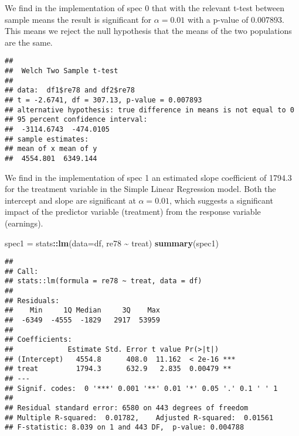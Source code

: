 \documentclass[
]{article}
\newenvironment{Shaded}{\begin{snugshade}}{\end{snugshade}}
\newcommand{\AttributeTok}[1]{\textcolor[rgb]{0.13,0.29,0.53}{#1}}
\newcommand{\FunctionTok}[1]{\textcolor[rgb]{0.13,0.29,0.53}{\textbf{#1}}}
\newcommand{\NormalTok}[1]{#1}
\newcommand{\OtherTok}[1]{\textcolor[rgb]{0.56,0.35,0.01}{#1}}
\newcommand{\SpecialCharTok}[1]{\textcolor[rgb]{0.81,0.36,0.00}{\textbf{#1}}}
\begin{document}
We find in the implementation of spec 0 that with the relevant t-test
between sample means the result is significant for \(\alpha = 0.01\)
with a p-value of 0.007893. This means we reject the null hypothesis
that the means of the two populations are the same.

\begin{Shaded}
\end{Shaded}

\begin{verbatim}
## 
##  Welch Two Sample t-test
## 
## data:  df1$re78 and df2$re78
## t = -2.6741, df = 307.13, p-value = 0.007893
## alternative hypothesis: true difference in means is not equal to 0
## 95 percent confidence interval:
##  -3114.6743  -474.0105
## sample estimates:
## mean of x mean of y 
##  4554.801  6349.144
\end{verbatim}

We find in the implementation of spec 1 an estimated slope coefficient
of 1794.3 for the treatment variable in the Simple Linear Regression
model. Both the intercept and slope are significant at
\(\alpha = 0.01\), which suggests a significant impact of the predictor
variable (treatment) from the response variable (earnings).

\begin{Shaded}
\begin{Highlighting}[]
\NormalTok{spec1 }\OtherTok{=}\NormalTok{ stats}\SpecialCharTok{::}\FunctionTok{lm}\NormalTok{(}\AttributeTok{data=}\NormalTok{df, re78 }\SpecialCharTok{\textasciitilde{}}\NormalTok{ treat)}
\FunctionTok{summary}\NormalTok{(spec1)}
\end{Highlighting}
\end{Shaded}

\begin{verbatim}
## 
## Call:
## stats::lm(formula = re78 ~ treat, data = df)
## 
## Residuals:
##    Min     1Q Median     3Q    Max 
##  -6349  -4555  -1829   2917  53959 
## 
## Coefficients:
##             Estimate Std. Error t value Pr(>|t|)    
## (Intercept)   4554.8      408.0  11.162  < 2e-16 ***
## treat         1794.3      632.9   2.835  0.00479 ** 
## ---
## Signif. codes:  0 '***' 0.001 '**' 0.01 '*' 0.05 '.' 0.1 ' ' 1
## 
## Residual standard error: 6580 on 443 degrees of freedom
## Multiple R-squared:  0.01782,    Adjusted R-squared:  0.01561 
## F-statistic: 8.039 on 1 and 443 DF,  p-value: 0.004788
\end{verbatim}
\end{document}
